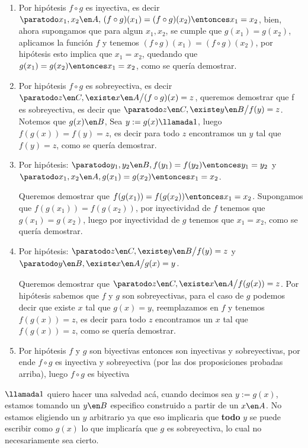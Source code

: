 \begin{enumerate}[label=\roman*)]
  \item Por hipótesis $f \circ g$ es inyectiva, es decir $\paratodo x_1, x_2 \en A, \, (f \circ g)(x_1) = (f \circ g)(x_2) \entonces
          x_1 = x_2$, bien, ahora supongamos que para algun $x_1, x_2$, se cumple que $g(x_1) = g(x_2)$, aplicamos la función $f$ y tenemos
        $(f \circ g)(x_1) = (f \circ g)(x_2)$, por hipótesis esto implica que $x_1 = x_2$, quedando que $g(x_1) = g(x_2) \entonces x_1 = x_2$, como se
        quería demostrar.

  \item Por hipótesis $f \circ g$ es sobreyectiva, es decir $\paratodo z \en C, \existe x \en A \big/ (f \circ g)(x) = z$, queremos demostrar que f
        es sobreyectiva, es decir que $\paratodo z \en C, \existe y \en B \big/ f(y) = z$. Notemos que $g(x) \en B$, Sea $y := g(x) \llamada1$, luego $f(g(x)) = f(y) = z$, es decir
        para todo $z$ encontramos un $y$ tal que $f(y) = z$, como se quería demostrar.

  \item Por hipótesis: $\paratodo y_1, y_2 \en B, f(y_1) = f(y_2) \entonces y_1 = y_2$  y
        $\paratodo x_1, x_2 \en A, g(x_1) = g(x_2) \entonces x_1 = x_2$.

        Queremos demostrar que $f(g(x_1)) = f(g(x_2)) \entonces x_1 = x_2$.
        Supongamos que $f(g(x_1)) = f(g(x_2))$, por inyectividad de $f$ tenemos que $g(x_1) = g(x_2)$, luego por inyectividad de $g$
        tenemos que $x_1 = x_2$, como se quería demostrar.

  \item Por hipótesis: $\paratodo z \en C, \existe y \en B \big/ f(y) = z$  y
        $\paratodo y \en B, \existe x \en A \big/ g(x) = y$.

        Queremos demostrar que $\paratodo z \en C, \existe x \en A \big/ f(g(x)) = z$.
        Por hipótesis sabemos que $f$ y $g$ son sobreyectivas, para el caso de $g$ podemos decir que existe $x$ tal que $g(x) = y$, reemplazamos en $f$ y tenemos
        $f(g(x)) = z$, es decir para todo $z$ encontramos un $x$ tal que $f(g(x)) = z$, como se quería demostrar.

  \item Por hipótesis $f$ y $g$ son biyectivas entonces son inyectivas y sobreyectivas,
        por ende $f \circ g$ es inyectiva y sobreyectiva (por las dos proposiciones probadas arriba), luego $f \circ g$ es biyectiva
\end{enumerate}

$\llamada1$ quiero hacer una salvedad acá, cuando decimos sea $y := g(x)$, estamos tomando un $y \en B$ especifico construido a partir de un $x \en A$.
No estamos eligiendo un $y$ arbitrario ya que eso implicaria que \textbf{todo} $y$ se puede escribir como $g(x)$ lo que
implicaría que $g$ es sobreyectiva, lo cual no necesariamente sea cierto.

\begin{aportes}
  \item {}
\end{aportes}
